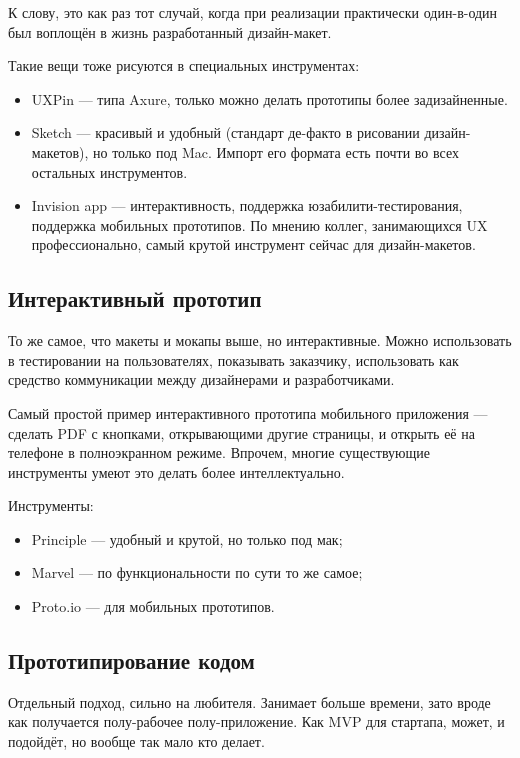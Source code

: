 \documentclass{../../text-style}
\begin{document}
К слову, это как раз тот случай, когда при реализации практически один-в-один был воплощён в жизнь разработанный дизайн-макет.

Такие вещи тоже рисуются в специальных инструментах:

\begin{itemize}
    \item UXPin ---  типа Axure, только можно делать прототипы более задизайненные.
    \item Sketch --- красивый и удобный (стандарт де-факто в рисовании дизайн-макетов), но только под Mac. Импорт его формата есть почти во всех остальных инструментов.
    \item Invision app --- интерактивность, поддержка юзабилити-тестирования, поддержка мобильных прототипов. По мнению коллег, занимающихся UX профессионально, самый крутой инструмент сейчас для дизайн-макетов.
\end{itemize}

\subsection{Интерактивный прототип}

То же самое, что макеты и мокапы выше, но интерактивные. Можно использовать в тестировании на пользователях, показывать заказчику, использовать как средство коммуникации между дизайнерами и разработчиками.

Самый простой пример интерактивного прототипа мобильного приложения --- сделать PDF с кнопками, открывающими другие страницы, и открыть её на телефоне в полноэкранном режиме. Впрочем, многие существующие инструменты умеют это делать более интеллектуально. 

Инструменты:

\begin{itemize}
    \item Principle --- удобный и крутой, но только под мак;
    \item Marvel --- по функциональности по сути то же самое;
    \item Proto.io --- для мобильных прототипов.
\end{itemize}

\subsection{Прототипирование кодом}

Отдельный подход, сильно на любителя. Занимает больше времени, зато вроде как получается полу-рабочее полу-приложение. Как MVP для стартапа, может, и подойдёт, но вообще так мало кто делает. 
\end{document}
